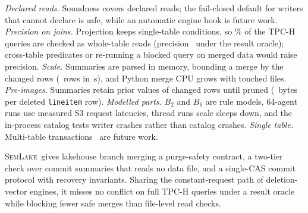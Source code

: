 \documentclass[sigconf, nonacm]{acmart}
\newcommand{\systemname}{\textsc{SemLake}}
\begin{document}
\emph{Declared reads.} Soundness covers declared reads; the fail-closed default for writers that cannot declare is safe, while an automatic engine hook is future work. \emph{Precision on joins.} Projection keeps single-table conditions, so \FullWidePct\% of the TPC-H queries are checked as whole-table reads (precision \FullSemPrec\ under the result oracle); cross-table predicates or re-running a blocked query on merged data would raise precision. \emph{Scale.} Summaries are parsed in memory, bounding a merge by the changed rows (\SweepMaxRows\ rows in \SweepMaxS\,s), and Python merge CPU grows with touched files. \emph{Pre-images.} Summaries retain prior values of changed rows until pruned (\PreBytesPerRow\ bytes per deleted \texttt{lineitem} row). \emph{Modelled parts.} $B_2$ and $B_6$ are rule models, 64-agent runs use measured S3 request latencies, thread runs scale sleeps down, and the in-process catalog tests writer crashes rather than catalog crashes. \emph{Single table.} Multi-table transactions~\cite{gotz2025lakevilla, gotz2026interoperable} are future work.

\systemname\ gives lakehouse branch merging a purge-safety contract, a two-tier check over commit summaries that reads no data file, and a single-CAS commit protocol with recovery invariants. Sharing the constant-request path of deletion-vector engines, it misses no conflict on full TPC-H queries under a result oracle while blocking fewer safe merges than file-level read checks.



\end{document}
